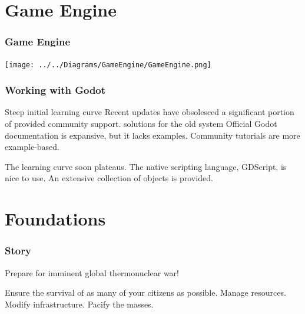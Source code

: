 \documentclass[ascpectratio=169]{beamer}
\begin{document}

\section{Game Engine}


\begin{frame}

  \frametitle{Game Engine}

  \begin{center}
    \texttt{[image: ../../Diagrams/GameEngine/GameEngine.png]}
  \end{center}

\end{frame}



\begin{frame}

  \frametitle{Working with Godot}

  \begin{outline}
    \1 Steep initial learning curve
    \1 Recent updates have obsolesced a significant portion of provided
    community support.
      \2 solutions for the old system
    \1 Official Godot documentation is expansive, but it lacks examples.
    \1 Community tutorials are more example-based.
  \end{outline}

  \vspace*{1cm}

  \begin{outline}
    \1 The learning curve soon plateaus.
    \1 The native scripting language, GDScript, is nice to use.
    \1 An extensive collection of objects is provided.
  \end{outline}

\end{frame}



\section{Foundations}


\begin{frame}

  \frametitle{Story}

  \begin{center}
    {\Large Prepare for imminent global thermonuclear war!}
  \end{center}

  \begin{outline}
    \1 Ensure the survival of as many of your citizens as possible.
    \1 Manage resources.
    \1 Modify infrastructure.
    \1 Pacify the masses.
  \end{outline}

\end{frame}
\end{document}
